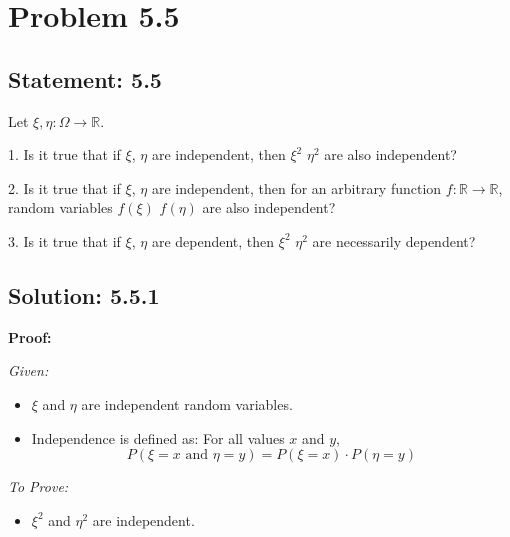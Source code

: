\section*{Problem 5.5}

\subsection*{Statement: 5.5}
Let $\xi, \eta : \Omega \rightarrow \mathbb{R}$.

1. Is it true that if $\xi$, $\eta$ are independent, then $\xi^2$ $\eta^2$ are also independent?

2. Is it true that if $\xi$, $\eta$ are independent, then for an arbitrary function $f : \mathbb{R} \rightarrow \mathbb{R}$, random variables $f(\xi)$ $f(\eta)$ are also independent?

3. Is it true that if $\xi$, $\eta$ are dependent, then $\xi^2$ $\eta^2$ are necessarily dependent?


\subsection*{Solution: 5.5.1}

\textbf{Proof:}

\textit{Given:}
\begin{itemize}
    \item \(\xi\) and \(\eta\) are independent random variables.
    \item Independence is defined as: For all values \( x \) and \( y \),
          $$ P(\xi = x \text{ and } \eta = y) = P(\xi = x) \cdot P(\eta = y) $$
\end{itemize}

\textit{To Prove:}
\begin{itemize}
    \item \(\xi^2\) and \(\eta^2\) are independent.
\end{itemize}

